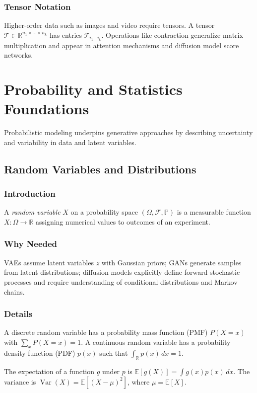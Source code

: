 \documentclass[11pt]{book}
\begin{document}
\subsection{Tensor Notation}
Higher-order data such as images and video require tensors. A tensor $\mathcal{T}\in\mathbb{R}^{n_1\times\cdots\times n_k}$ has entries $\mathcal{T}_{i_1\dots i_k}$. Operations like contraction generalize matrix multiplication and appear in attention mechanisms and diffusion model score networks.

\chapter{Probability and Statistics Foundations}
Probabilistic modeling underpins generative approaches by describing uncertainty and variability in data and latent variables.

\section{Random Variables and Distributions}
\subsection{Introduction}
A \emph{random variable} $X$ on a probability space $(\Omega,\mathcal{F},\mathbb{P})$ is a measurable function $X:\Omega\to\mathbb{R}$ assigning numerical values to outcomes of an experiment.

\subsection{Why Needed}
VAEs assume latent variables $z$ with Gaussian priors; GANs generate samples from latent distributions; diffusion models explicitly define forward stochastic processes and require understanding of conditional distributions and Markov chains.

\subsection{Details}
A discrete random variable has a probability mass function (PMF) $P(X=x)$ with $\sum_x P(X=x)=1$. A continuous random variable has a probability density function (PDF) $p(x)$ such that $\int_{\mathbb{R}} p(x)\,dx=1$.

The expectation of a function $g$ under $p$ is $\mathbb{E}[g(X)]=\int g(x)p(x)\,dx$. The variance is $\operatorname{Var}(X)=\mathbb{E}[(X-\mu)^2]$, where $\mu=\mathbb{E}[X]$.
\end{document}
